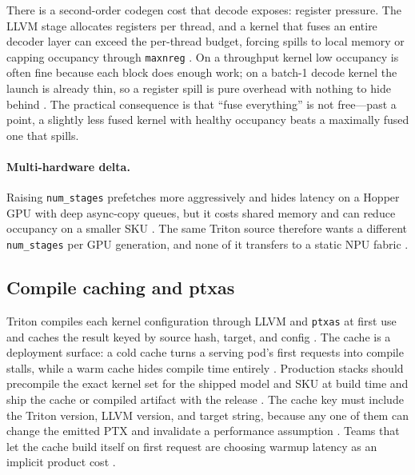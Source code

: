 There is a second-order codegen cost that decode exposes: register pressure. The LLVM stage allocates registers per thread, and a kernel that fuses an entire decoder layer can exceed the per-thread budget, forcing spills to local memory or capping occupancy through \texttt{maxnreg} \citep{tritonlang2024,nvidia2022hopper}. On a throughput kernel low occupancy is often fine because each block does enough work; on a batch-1 decode kernel the launch is already thin, so a register spill is pure overhead with nothing to hide behind \citep{taxbreak2026,memoryfloor2026}. The practical consequence is that ``fuse everything'' is not free---past a point, a slightly less fused kernel with healthy occupancy beats a maximally fused one that spills.

\paragraph{Multi-hardware delta.} Raising \texttt{num\_stages} prefetches more aggressively and hides latency on a Hopper GPU with deep async-copy queues, but it costs shared memory and can reduce occupancy on a smaller SKU \citep{semianalysis2024tma,nvidia2022hopper}. The same Triton source therefore wants a different \texttt{num\_stages} per GPU generation, and none of it transfers to a static NPU fabric \citep{amd2024xdna}.

\subsection{Compile caching and ptxas}

Triton compiles each kernel configuration through LLVM and \texttt{ptxas} at first use and caches the result keyed by source hash, target, and config \citep{tritonlang2024}. The cache is a deployment surface: a cold cache turns a serving pod's first requests into compile stalls, while a warm cache hides compile time entirely \citep{patel2025llminference,taxbreak2026}. Production stacks should precompile the exact kernel set for the shipped model and SKU at build time and ship the cache or compiled artifact with the release \citep{chen2020compilerbasedhardw,memoryfloor2026}. The cache key must include the Triton version, LLVM version, and target string, because any one of them can change the emitted PTX and invalidate a performance assumption \citep{tritonlang2024,patel2025llminference}. Teams that let the cache build itself on first request are choosing warmup latency as an implicit product cost \citep{kwon2023vllm,memoryfloor2026}.

